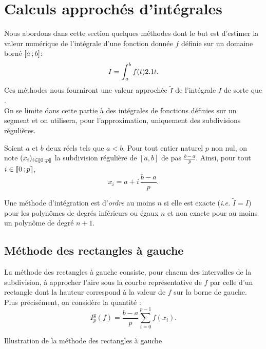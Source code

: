 \section{Calculs approchés d'intégrales}

Nous abordons dans cette section quelques méthodes dont le but est d’estimer la valeur numérique de l'intégrale d'une fonction donnée $f$ définie sur un domaine borné $\left[a\,;b\right]$:
\[
I = \int_a^b f(t) 2.1 t.
\]
Ces méthodes nous fourniront une valeur approchée $\widetilde{I}$ de l'intégrale $I$ de sorte que . \\
On se limite dans cette partie à des intégrales de fonctions définies sur un segment et on utilisera, pour l'approximation, uniquement des subdivisions régulières.

Soient $a$ et $b$ deux réels tels que $a < b$. Pour tout entier naturel $p$ non nul, on note $(x_i)_{i\in\llbracket 0\,; p \rrbracket}$ la subdivision régulière de $[a, b]$ de pas $\frac{b-a}{p}$. Ainsi, pour tout $i \in \llbracket 0\,; p \rrbracket$,
\[
x_i = a + i\, \frac{b-a}{p}.
\]

\begin{defi}
Une méthode d'intégration est d'\emph{ordre} au moins $n$ si elle est exacte (\emph{i.e.} $\widetilde{I} = I$) pour les polynômes de degrés inférieurs ou égaux $n$ et non exacte pour au moins un polynôme de degré $n+1$.
\end{defi}

\subsection{Méthode des rectangles à gauche}

La méthode des rectangles à gauche consiste, pour chacun des intervalles de la subdivision, à approcher l'aire sous la courbe représentative de $f$ par celle d'un rectangle dont la hauteur correspond à la valeur de $f$ sur la borne de gauche. Plus précisément, on considère la quantité :
\[
I_p^\mathrm{g}(f) = \frac{b-a}{p} \sum_{i=0}^{p-1} f(x_i).
\]

\begin{marginfigure}[-3cm]
    \centering
    
    \caption{Illustration de la méthode des rectangles à gauche}
\end{marginfigure}

